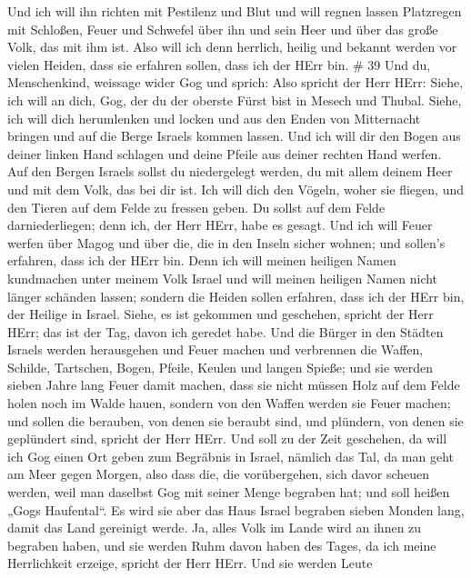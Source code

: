 Und ich will ihn richten mit Pestilenz und Blut und will regnen lassen
Platzregen mit Schloßen, Feuer und Schwefel über ihn und sein Heer und
über das große Volk, das mit ihm ist.  Also will ich denn
herrlich, heilig und bekannt werden vor vielen Heiden, dass sie erfahren
sollen, dass ich der HErr bin. \# 39  Und du, Menschenkind,
weissage wider Gog und sprich: Also spricht der Herr HErr: Siehe, ich
will an dich, Gog, der du der oberste Fürst bist in Mesech und Thubal.
 Siehe, ich will dich herumlenken und locken und aus den
Enden von Mitternacht bringen und auf die Berge Israels kommen lassen.
 Und ich will dir den Bogen aus deiner linken Hand schlagen
und deine Pfeile aus deiner rechten Hand werfen.  Auf den
Bergen Israels sollst du niedergelegt werden, du mit allem deinem Heer
und mit dem Volk, das bei dir ist. Ich will dich den Vögeln, woher sie
fliegen, und den Tieren auf dem Felde zu fressen geben.  Du
sollst auf dem Felde darniederliegen; denn ich, der Herr HErr, habe es
gesagt.  Und ich will Feuer werfen über Magog und über die,
die in den Inseln sicher wohnen; und sollen's erfahren, dass ich der
HErr bin.  Denn ich will meinen heiligen Namen kundmachen
unter meinem Volk Israel und will meinen heiligen Namen nicht länger
schänden lassen; sondern die Heiden sollen erfahren, dass ich der HErr
bin, der Heilige in Israel.  Siehe, es ist gekommen und
geschehen, spricht der Herr HErr; das ist der Tag, davon ich geredet
habe.  Und die Bürger in den Städten Israels werden
herausgehen und Feuer machen und verbrennen die Waffen, Schilde,
Tartschen, Bogen, Pfeile, Keulen und langen Spieße; und sie werden
sieben Jahre lang Feuer damit machen,  dass sie nicht
müssen Holz auf dem Felde holen noch im Walde hauen, sondern von den
Waffen werden sie Feuer machen; und sollen die berauben, von denen sie
beraubt sind, und plündern, von denen sie geplündert sind, spricht der
Herr HErr.  Und soll zu der Zeit geschehen, da will ich Gog
einen Ort geben zum Begräbnis in Israel, nämlich das Tal, da man geht am
Meer gegen Morgen, also dass die, die vorübergehen, sich davor scheuen
werden, weil man daselbst Gog mit seiner Menge begraben hat; und soll
heißen „Gogs Haufental``.  Es wird sie aber das Haus Israel
begraben sieben Monden lang, damit das Land gereinigt werde.
 Ja, alles Volk im Lande wird an ihnen zu begraben haben,
und sie werden Ruhm davon haben des Tages, da ich meine Herrlichkeit
erzeige, spricht der Herr HErr.  Und sie werden Leute
